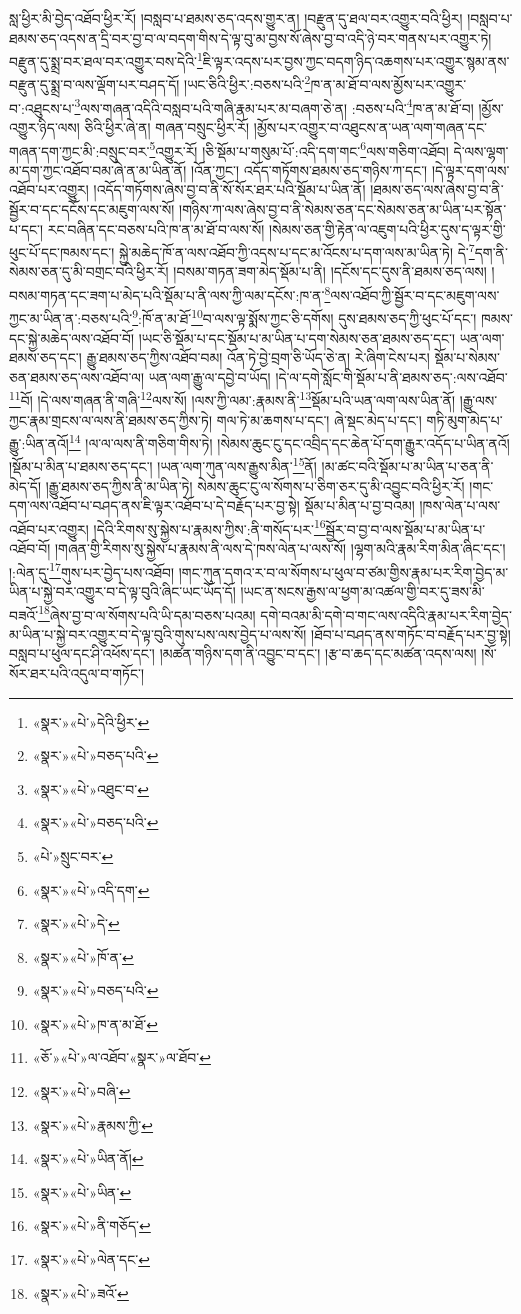 སླ་ཕྱིར་མི་བྱེད་འཐོབ་ཕྱིར་རོ། །བསླབ་པ་ཐམས་ཅད་འདས་གྱུར་ན། །བརྫུན་དུ་ཐལ་བར་འགྱུར་བའི་ཕྱིར། །བསླབ་པ་ཐམས་ཅད་འདས་ན་དྲི་བར་བྱ་བ་ལ་བདག་གིས་དེ་ལྟ་བུ་མ་བྱས་སོ་ཞེས་བྱ་བ་འདི་ཉེ་བར་གནས་པར་འགྱུར་ཏེ། བརྫུན་དུ་སྨྲ་བར་ཐལ་བར་འགྱུར་བས་དེའི་\footnote{«སྣར་»«པེ་»དེའི་ཕྱིར་}ཇི་ལྟར་འདས་པར་བྱས་ཀྱང་བདག་ཉིད་འཆགས་པར་འགྱུར་སྙམ་ནས་བརྫུན་དུ་སྨྲ་བ་ལས་ལྡོག་པར་བཤད་དོ། །ཡང་ཅིའི་ཕྱིར་:བཅས་པའི་\footnote{«སྣར་»«པེ་»བཅད་པའི་}ཁ་ན་མ་ཐོ་བ་ལས་མྱོས་པར་འགྱུར་བ་:འཐུངས་པ་\footnote{«སྣར་»«པེ་»འཐུང་བ་}ལས་གཞན་འདིའི་བསླབ་པའི་གཞི་རྣམ་པར་མ་བཞག་ཅེ་ན། :བཅས་པའི་\footnote{«སྣར་»«པེ་»བཅད་པའི་}ཁ་ན་མ་ཐོ་བ། །མྱོས་འགྱུར་ཉིད་ལས། ཅིའི་ཕྱིར་ཞེ་ན། གཞན་བསྲུང་ཕྱིར་རོ། །མྱོས་པར་འགྱུར་བ་འཐུངས་ན་ཡན་ལག་གཞན་དང་གཞན་དག་ཀྱང་མི་:བསྲུང་བར་\footnote{«པེ་»སྲུང་བར་}འགྱུར་རོ། །ཅི་སྡོམ་པ་གསུམ་པོ་:འདི་དག་གང་\footnote{«སྣར་»«པེ་»འདི་དག་}ལས་གཅིག་འཐོབ། དེ་ལས་ལྷག་མ་དག་ཀྱང་འཐོབ་བམ་ཞེ་ན་མ་ཡིན་ནོ། །འོན་ཀྱང་། འདོད་གཏོགས་ཐམས་ཅད་གཉིས་ཀ་དང་། །དེ་ལྟར་དག་ལས་འཐོབ་པར་འགྱུར། །འདོད་གཏོགས་ཞེས་བྱ་བ་ནི་སོ་སོར་ཐར་པའི་སྡོམ་པ་ཡིན་ནོ། །ཐམས་ཅད་ལས་ཞེས་བྱ་བ་ནི་སྦྱོར་བ་དང་དངོས་དང་མཇུག་ལས་སོ། །གཉིས་ཀ་ལས་ཞེས་བྱ་བ་ནི་སེམས་ཅན་དང་སེམས་ཅན་མ་ཡིན་པར་སྟོན་པ་དང་། རང་བཞིན་དང་བཅས་པའི་ཁ་ན་མ་ཐོ་བ་ལས་སོ། །སེམས་ཅན་གྱི་རྟེན་ལ་འཇུག་པའི་ཕྱིར་དུས་ད་ལྟར་གྱི་ཕུང་པོ་དང་ཁམས་དང་། སྐྱེ་མཆེད་ཁོ་ན་ལས་འཐོབ་ཀྱི་འདས་པ་དང་མ་འོངས་པ་དག་ལས་མ་ཡིན་ཏེ། དེ་\footnote{«སྣར་»«པེ་»དེ་}དག་ནི་སེམས་ཅན་དུ་མི་བགྲང་བའི་ཕྱིར་རོ། །བསམ་གཏན་ཟག་མེད་སྡོམ་པ་ནི། །དངོས་དང་དུས་ནི་ཐམས་ཅད་ལས། །བསམ་གཏན་དང་ཟག་པ་མེད་པའི་སྡོམ་པ་ནི་ལས་ཀྱི་ལམ་དངོས་:ཁ་ན་\footnote{«སྣར་»«པེ་»ཁོ་ན་}ལས་འཐོབ་ཀྱི་སྦྱོར་བ་དང་མཇུག་ལས་ཀྱང་མ་ཡིན་ན་:བཅས་པའི་\footnote{«སྣར་»«པེ་»བཅད་པའི་}:ཁོ་ན་མ་ཐོ་\footnote{«སྣར་»«པེ་»ཁ་ན་མ་ཐོ་}བ་ལས་ལྟ་སྨོས་ཀྱང་ཅི་དགོས། དུས་ཐམས་ཅད་ཀྱི་ཕུང་པོ་དང་། ཁམས་དང་སྐྱེ་མཆེད་ལས་འཐོབ་བོ། །ཡང་ཅི་སྡོམ་པ་དང་སྡོམ་པ་མ་ཡིན་པ་དག་སེམས་ཅན་ཐམས་ཅད་དང་། ཡན་ལག་ཐམས་ཅད་དང་། རྒྱུ་ཐམས་ཅད་ཀྱིས་འཐོབ་བམ། འོན་ཏེ་བྱེ་བྲག་ཅི་ཡོད་ཅེ་ན། རེ་ཞིག་ངེས་པར། སྡོམ་པ་སེམས་ཅན་ཐམས་ཅད་ལས་འཐོབ་ལ། ཡན་ལག་རྒྱུ་ལ་དབྱེ་བ་ཡོད། །དེ་ལ་དགེ་སློང་གི་སྡོམ་པ་ནི་ཐམས་ཅད་:ལས་འཐོབ་\footnote{«ཅོ་»«པེ་»ལ་འཐོབ་«སྣར་»ལ་ཐོབ་}བོ། །དེ་ལས་གཞན་ནི་གཞི་\footnote{«སྣར་»«པེ་»བཞི་}ལས་སོ། །ལས་ཀྱི་ལམ་:རྣམས་ནི་\footnote{«སྣར་»«པེ་»རྣམས་ཀྱི་}སྡོམ་པའི་ཡན་ལག་ལས་ཡིན་ནོ། །རྒྱུ་ལས་ཀྱང་རྣམ་གྲངས་ལ་ལས་ནི་ཐམས་ཅད་ཀྱིས་ཏེ། གལ་ཏེ་མ་ཆགས་པ་དང་། ཞེ་སྡང་མེད་པ་དང་། གཏི་མུག་མེད་པ་རྒྱུ་:ཡིན་ནའོ།\footnote{«སྣར་»«པེ་»ཡིན་ནོ།} །ལ་ལ་ལས་ནི་གཅིག་གིས་ཏེ། །སེམས་ཆུང་ངུ་དང་འབྲིད་དང་ཆེན་པོ་དག་རྒྱུར་འདོད་པ་ཡིན་ནའོ། །སྡོམ་པ་མིན་པ་ཐམས་ཅད་དང་། །ཡན་ལག་ཀུན་ལས་རྒྱུས་མིན་\footnote{«སྣར་»«པེ་»ཡིན་}ནོ། །མ་ཚང་བའི་སྡོམ་པ་མ་ཡིན་པ་ཅན་ནི་མེད་དོ། །རྒྱུ་ཐམས་ཅད་ཀྱིས་ནི་མ་ཡིན་ཏེ། སེམས་ཆུང་ངུ་ལ་སོགས་པ་ཅིག་ཅར་དུ་མི་འབྱུང་བའི་ཕྱིར་རོ། །གང་དག་ལས་འཐོབ་པ་བཤད་ནས་ཇི་ལྟར་འཐོབ་པ་དེ་བརྗོད་པར་བྱ་སྟེ། སྡོམ་པ་མིན་པ་བྱ་བའམ། །ཁས་ལེན་པ་ལས་འཐོབ་པར་འགྱུར། །དེའི་རིགས་སུ་སྐྱེས་པ་རྣམས་ཀྱིས་:ནི་གསོད་པར་\footnote{«སྣར་»«པེ་»ནི་གཅོད་}སྦྱོར་བ་བྱ་བ་ལས་སྡོམ་པ་མ་ཡིན་པ་འཐོབ་བོ། །གཞན་གྱི་རིགས་སུ་སྐྱེས་པ་རྣམས་ནི་ལས་དེ་ཁས་ལེན་པ་ལས་སོ། །ལྷག་མའི་རྣམ་རིག་མིན་ཞིང་དང་། །:ལེན་དུ་\footnote{«སྣར་»«པེ་»ལེན་དང་}གུས་པར་བྱེད་པས་འཐོབ། །གང་ཀུན་དགའ་ར་བ་ལ་སོགས་པ་ཕུལ་བ་ཙམ་གྱིས་རྣམ་པར་རིག་བྱེད་མ་ཡིན་པ་སྐྱེ་བར་འགྱུར་བ་དེ་ལྟ་བུའི་ཞིང་ཡང་ཡོད་དོ། །ཡང་ན་སངས་རྒྱས་ལ་ཕྱག་མ་འཚལ་གྱི་བར་དུ་ཟས་མི་བཟའོ་\footnote{«སྣར་»«པེ་»ཟའོ་}ཞེས་བྱ་བ་ལ་སོགས་པའི་ཡི་དམ་བཅས་པའམ། དགེ་བའམ་མི་དགེ་བ་གང་ལས་འདིའི་རྣམ་པར་རིག་བྱེད་མ་ཡིན་པ་སྐྱེ་བར་འགྱུར་བ་དེ་ལྟ་བུའི་གུས་པས་ལས་བྱེད་པ་ལས་སོ། །ཐོབ་པ་བཤད་ནས་གཏོང་བ་བརྗོད་པར་བྱ་སྟེ། བསླབ་པ་ཕུལ་དང་ཤི་འཕོས་དང་། །མཚན་གཉིས་དག་ནི་འབྱུང་བ་དང་། །རྩ་བ་ཆད་དང་མཚན་འདས་ལས། །སོ་སོར་ཐར་པའི་འདུལ་བ་གཏོང་། 